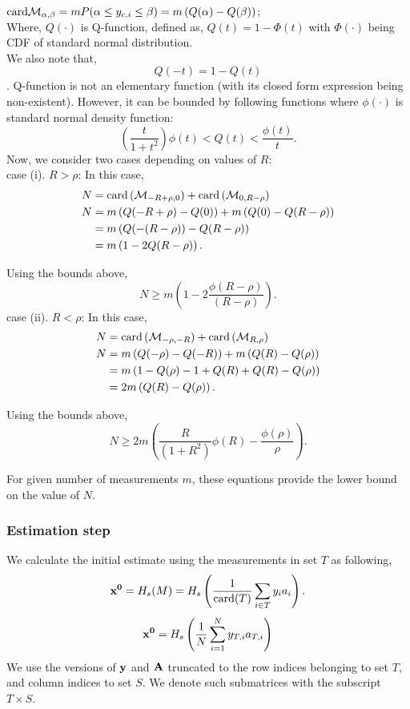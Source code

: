 $\mathrm{card}{\mathcal{M}_{\alpha,\beta}}=mP(\alpha \leq y_{c,i}\leq \beta) = m\left(Q(\alpha)- Q(\beta)\right)$; \\
Where, $Q(\cdot)$ is Q-function, defined as, $Q(t) = 1-\Phi(t)$ with $\Phi(\cdot)$ being CDF of standard normal distribution. \\
We also note that,
 $$Q(-t) = 1 - Q(t)$$.
Q-function is not an elementary function (with its closed form expression being non-existent). However, it can be bounded by following functions where $\phi(\cdot)$ is standard normal density function:
$$
\left(\frac{t}{1+t^2}\right)\phi(t) < Q(t) < \frac{\phi(t)}{t}.
$$
Now, we consider two cases depending on values of $R$: \\
case (i). $R > \rho$: In this case,
\begin{align}
N & = \mathrm{card}\left(\mathcal{M}_{-R + \rho,0}\right) + \mathrm{card}\left(\mathcal{M}_{0, R-\rho}\right) \nonumber \\
N &  = m\left(Q(-R+\rho)- Q(0)\right) + m\left(Q(0)- Q(R-\rho)\right) \nonumber \\
& = m\left(Q(-(R-\rho))- Q(R-\rho)\right) \nonumber \\
& = m\left(1-2Q(R-\rho)\right).
\end{align}

Using the bounds above,
$$
N \geq m \left(1-2\frac{\phi(R-\rho)}{(R-\rho)} \right).
$$
\noindent case (ii). $R < \rho$: In this case,
\begin{align}
N & = \mathrm{card}\left(\mathcal{M}_{-\rho,-R}\right) + \mathrm{card}\left(\mathcal{M}_{R,\rho}\right) \nonumber \\
N & = m\left(Q(-\rho)- Q(-R)\right) + m\left(Q(R)- Q(\rho)\right) \nonumber \\
& = m\left(1 - Q(\rho)-1 +Q(R) +Q(R) -Q(\rho)\right) \nonumber \\
& = 2m\left(Q(R)-Q(\rho)\right).
\end{align}

Using the bounds above,
$$
N \geq 2m \left(\frac{R}{(1+R^2)} \phi(R) - \frac{\phi(\rho)}{\rho}\right).
$$

For given number of measurements $m$, these equations provide the lower bound on the value of $N$.
\subsubsection{Estimation step}

We calculate the initial estimate using the measurements in set $T$ as following,
$$
\mathbf{{x}^0} = H_s(M) = H_s\left(\frac{1}{\mathrm{card}(T)}\sum_{i\in T}y_{i}a_{i}\right).
$$
$$
\mathbf{x^0} = H_s\left( \frac{1}{N}\sum_{i=1}^{N}y_{T,i}a_{T,i}\right)
$$
We use the versions of $\mathbf{y}$ and $\mathbf{A}$ truncated to the row indices belonging to set $T$, and column indices to set $S$. We denote such submatrices with the subscript $T\times S$. 

